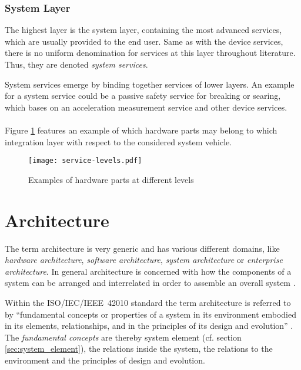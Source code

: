 \subsubsection{System Layer}
The highest layer is the system layer, containing the most advanced services, which are usually provided to the end user. Same as with the device services, there is no uniform denomination for services at this layer throughout literature. Thus, they are denoted \emph{system services}.

System services emerge by binding together services of lower layers. An example for a system service could be a passive safety service for breaking or searing, which bases on an acceleration measurement service and other device services.
\\
\\
Figure \ref{fig:service_levels} features an example of which hardware parts may belong to which integration layer with respect to the considered system vehicle. 


\begin{figure}[!htbp]
\centering
\texttt{[image: service-levels.pdf]}
\caption{Examples of hardware parts at different levels \cite{avl}}
\label{fig:service_levels}
\end{figure}









\section{Architecture}

\label{ch:architecture}

The term architecture is very generic and has various different domains, like \emph{hardware architecture}, \emph{software architecture}, \emph{system architecture} or \emph{enterprise architecture}. In general architecture is concerned with how the components of a system can be arranged and interrelated in order to assemble an overall system \cite{ISO_42010} \cite{ning}. 

Within the \mbox{ISO/IEC/IEEE 42010} standard the term architecture is referred to by ``fundamental concepts or properties of a system in its environment embodied in its elements, relationships, and in the principles of its design and evolution'' \cite{ISO_42010}. The \emph{fundamental concepts} are thereby system element (cf. section \ref{sec:system_element}), the relations inside the system, the relations to the environment and the principles of design and evolution.

